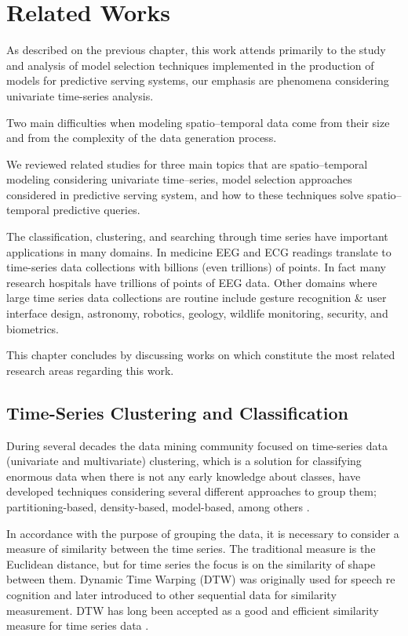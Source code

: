 \chapter{Related Works}\label{chapter_Related_Works}

As described on the previous chapter, this work attends primarily to the study and analysis of model selection techniques implemented in the production of models for predictive serving systems, our emphasis are phenomena considering univariate time-series analysis. 

Two main difficulties when modeling spatio--temporal data come from their size and from the complexity of the data generation process. \cite{}

We reviewed related studies for three main topics that are spatio--temporal modeling considering univariate time--series, model selection approaches considered in predictive serving system, and how to these techniques solve spatio--temporal predictive queries.

The classification, clustering, and searching through time series have important applications in many domains. In medicine EEG and ECG readings translate to time-series data collections with billions (even trillions) of points. In fact many research hospitals have trillions of points of EEG data. Other domains where large time series data collections are routine include gesture recognition \& user interface design, astronomy, robotics, geology, wildlife monitoring, security, and biometrics. 



This chapter concludes by discussing works on which constitute the most related research areas regarding this work.



\section{Time-Series Clustering and Classification}


During several decades the data mining community focused on time-series data (univariate and multivariate) clustering, which is a solution for classifying enormous data when there is not any early knowledge about classes, have developed techniques considering several different approaches to group them; partitioning-based, density-based, model-based, among others \cite{}. 

In accordance with the purpose of grouping the data, it is necessary to consider a measure of similarity between the time series. The traditional measure is the Euclidean distance, but for time series the focus is on the similarity of shape between them. Dynamic Time Warping (DTW) was originally used for speech re cognition and later introduced to other sequential data for similarity measurement. DTW has long been accepted as a good and efficient similarity measure for time series data \cite{}.






